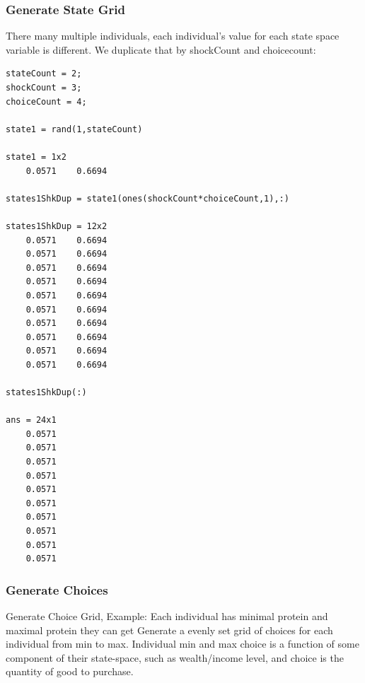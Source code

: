 \documentclass[
]{book}
\begin{document}
\hypertarget{generate-state-grid}{%
\subsubsection{\texorpdfstring{\textbf{Generate State Grid}}{Generate State Grid}}\label{generate-state-grid}}

There many multiple individuals, each individual's value for each state
space variable is different. We duplicate that by shockCount and
choicecount:

\begin{verbatim}
stateCount = 2;
shockCount = 3;
choiceCount = 4;

state1 = rand(1,stateCount)

state1 = 1x2    
    0.0571    0.6694

states1ShkDup = state1(ones(shockCount*choiceCount,1),:)

states1ShkDup = 12x2    
    0.0571    0.6694
    0.0571    0.6694
    0.0571    0.6694
    0.0571    0.6694
    0.0571    0.6694
    0.0571    0.6694
    0.0571    0.6694
    0.0571    0.6694
    0.0571    0.6694
    0.0571    0.6694

states1ShkDup(:)

ans = 24x1    
    0.0571
    0.0571
    0.0571
    0.0571
    0.0571
    0.0571
    0.0571
    0.0571
    0.0571
    0.0571
\end{verbatim}

\hypertarget{generate-choices}{%
\subsubsection{\texorpdfstring{\textbf{Generate Choices}}{Generate Choices}}\label{generate-choices}}

Generate Choice Grid, Example: Each individual has minimal protein and
maximal protein they can get Generate a evenly set grid of choices for
each individual from min to max. Individual min and max choice is a
function of some component of their state-space, such as wealth/income
level, and choice is the quantity of good to purchase.
\end{document}

